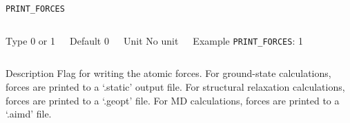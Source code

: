 \documentclass[xcolor=dvipsnames,t]{beamer}
\begin{document}
\begin{frame}[allowframebreaks]{\texttt{PRINT\_FORCES}} \label{PRINT_FORCES}
\vspace*{-12pt}
\begin{columns}
\begin{block}{Type}
0 or 1
\end{block}

\begin{block}{Default}
0
\end{block}

\begin{block}{Unit}
No unit
\end{block}

\begin{block}{Example}
\texttt{PRINT\_FORCES}: 1
\end{block}
\end{columns}

\begin{block}{Description}
Flag for writing the atomic forces. For ground-state calculations, forces are printed to a `.static' output file. For structural relaxation calculations, forces are printed to a `.geopt' file. For MD calculations, forces are printed to a `.aimd' file.
\end{block}

\end{frame}
\end{document}
